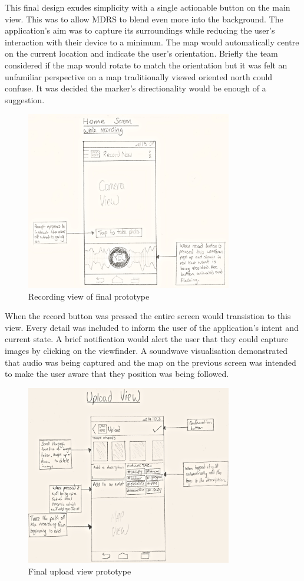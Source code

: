 \documentclass{l3proj}
\begin{document}
This final design exudes simplicity with a single actionable button on the main view. This was to allow MDRS to blend even more into the background. The application's aim was to capture its surroundings while reducing the user's interaction with their device to a minimum. The map would automatically centre on the current location and indicate the user's orientation. Briefly the team considered if the map would rotate to match the orientation but it was felt an unfamiliar perspective on a map traditionally viewed oriented north could confuse. It was decided the marker's directionality would be enough of a suggestion.

\begin{figure}[ht!]
\centering
\includegraphics[width=90mm]{images/android-recording-view.jpg}
\caption{Recording view of final prototype}
\end{figure}

When the record button was pressed the entire screen would transistion to this view. Every detail was included to inform the user of the application's intent and current state. A brief notification would alert the user that they could capture images by clicking on the viewfinder. A soundwave visualisation demonstrated that audio was being captured and the map on the previous screen was intended to make the user aware that they position was being followed.

\begin{figure}[ht!]
\centering
\includegraphics[width=90mm]{images/android-upload-view.jpg}
\caption{Final upload view prototype}
\end{figure}
\end{document}

